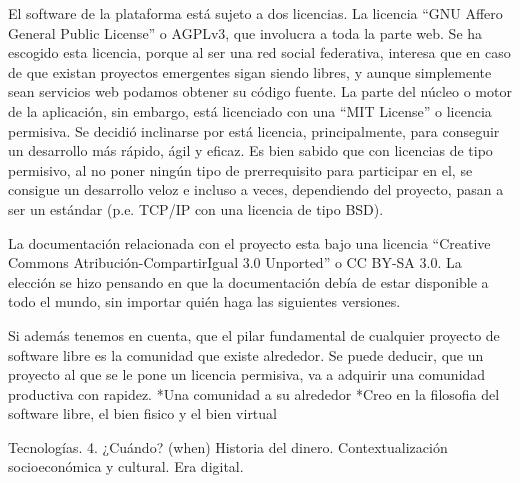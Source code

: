 El software de la plataforma  está sujeto a dos licencias. La licencia ``GNU Affero General Public License'' o AGPLv3, que involucra a toda la parte web. Se ha escogido esta licencia, porque al ser una red social federativa, interesa que en caso de que existan proyectos emergentes sigan siendo libres, y aunque simplemente sean servicios web podamos obtener su código fuente. La parte del núcleo o motor de la aplicación, sin embargo, está licenciado con una ``MIT License'' o licencia permisiva. Se decidió inclinarse por está licencia, principalmente, para conseguir un desarrollo más rápido, ágil y eficaz. Es bien sabido que con licencias de tipo permisivo, al no poner ningún tipo de prerrequisito para participar en el, se consigue un desarrollo veloz e incluso a veces, dependiendo del proyecto, pasan a ser un estándar (p.e. TCP/IP con una licencia de tipo BSD). 

La documentación relacionada con el proyecto esta bajo una licencia ``Creative Commons Atribución-CompartirIgual 3.0 Unported'' o CC BY-SA 3.0. La elección se hizo pensando en que la documentación debía de estar disponible a todo el mundo, sin importar quién haga las siguientes versiones.

Si además tenemos en cuenta, que el pilar fundamental de cualquier proyecto de software libre es la comunidad que existe alrededor. Se puede deducir, que un proyecto al que se le pone un licencia permisiva, va a adquirir una comunidad productiva con rapidez.
*Una comunidad a su alrededor
*Creo en la filosofia del software libre, el bien fisico y el bien virtual

Tecnologías.
4. ¿Cuándo? (when) 
Historia del dinero.
Contextualización socioeconómica y cultural. Era digital.

